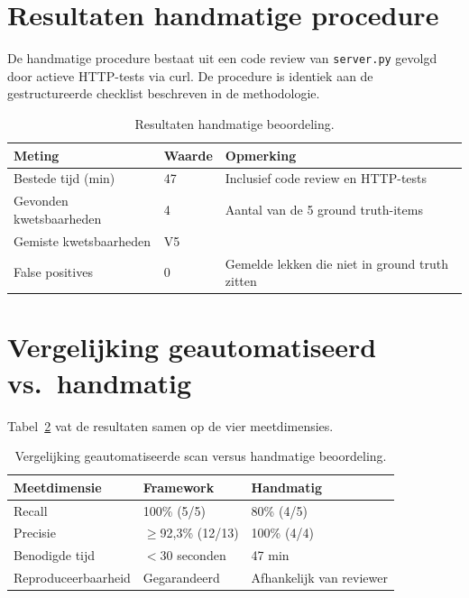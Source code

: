 \section{Resultaten handmatige procedure}

De handmatige procedure bestaat uit een code review van \texttt{server.py} gevolgd door actieve HTTP-tests via curl. De procedure is identiek aan de gestructureerde checklist beschreven in de methodologie.

\begin{table}[htbp]
    \centering
    \caption{Resultaten handmatige beoordeling.}
    \label{tab:manueel}
    \begin{tabular}{@{}lll@{}}
        \toprule
        \textbf{Meting} & \textbf{Waarde} & \textbf{Opmerking} \\ \midrule
        Bestede tijd (min)       & 47 & Inclusief code review en HTTP-tests \\
        Gevonden kwetsbaarheden  & 4  & Aantal van de 5 ground truth-items \\
        Gemiste kwetsbaarheden   & V5 & \\
        False positives          & 0  & Gemelde lekken die niet in ground truth zitten \\ \bottomrule
    \end{tabular}
\end{table}

\section{Vergelijking geautomatiseerd vs.\ handmatig}

Tabel~\ref{tab:vergelijking} vat de resultaten samen op de vier meetdimensies.

\begin{table}[htbp]
    \centering
    \caption{Vergelijking geautomatiseerde scan versus handmatige beoordeling.}
    \label{tab:vergelijking}
    \begin{tabular}{@{}lll@{}}
        \toprule
        \textbf{Meetdimensie}   & \textbf{Framework} & \textbf{Handmatig} \\ \midrule
        Recall                  & 100\% (5/5)        & 80\% (4/5) \\
        Precisie                & $\geq$92,3\% (12/13) & 100\% (4/4) \\
        Benodigde tijd          & $<$30 seconden     & 47 min \\
        Reproduceerbaarheid     & Gegarandeerd       & Afhankelijk van reviewer \\ \bottomrule
    \end{tabular}
\end{table}

